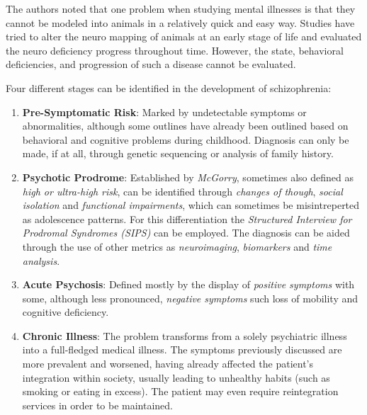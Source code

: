 \documentclass{Paper_Summary}
\begin{document}
    The authors noted that one problem when studying mental illnesses is that they cannot be modeled into animals in a relatively quick and easy way. Studies have tried to alter the neuro mapping of animals at an early stage of life and evaluated the neuro deficiency progress throughout time. However, the state, behavioral deficiencies, and progression of such a disease cannot be evaluated.

    Four different stages can be identified in the development of schizophrenia:
    \begin{enumerate}
        \item \textbf{Pre-Symptomatic Risk}: Marked by undetectable symptoms or abnormalities, although some outlines have already been outlined based on behavioral and cognitive problems during childhood. Diagnosis can only be made, if at all, through genetic sequencing or analysis of family history.
        \item \textbf{Psychotic Prodrome}: Established by \emph{McGorry}, sometimes also defined as \emph{high or ultra-high risk}, can be identified through \emph{changes of though}, \emph{social isolation} and \emph{functional impairments}, which can sometimes be misintreperted as adolescence patterns. For this differentiation the \emph{Structured Interview for Prodromal Syndromes (SIPS)} can be employed. The diagnosis can be aided through the use of other metrics as \emph{neuroimaging}, \emph{biomarkers} and \emph{time analysis}.
        \item \textbf{Acute Psychosis}: Defined mostly by the display of \emph{positive symptoms} with some, although less pronounced, \emph{negative symptoms} such loss of mobility and cognitive deficiency.
        \item \textbf{Chronic Illness}: The problem transforms from a solely psychiatric illness into a full-fledged medical illness. The symptoms previously discussed are more prevalent and worsened, having already affected the patient's integration within society, usually leading to unhealthy habits (such as smoking or eating in excess). The patient may even require reintegration services in order to be maintained.
    \end{enumerate}
\end{document}
